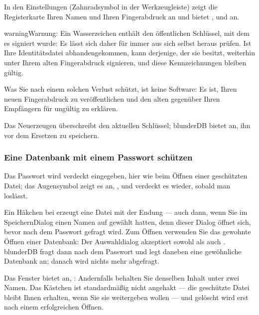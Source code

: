 \documentclass[letterpaper,10pt,german]{sphinxmanual}
\begin{document}
\sphinxAtStartPar
In den Einstellungen (Zahnradsymbol in der Werkzeugleiste) zeigt die Registerkarte  Ihren Namen und Ihren Fingerabdruck an und bietet ,  und  an.

\begin{sphinxadmonition}{warning}{Warnung:}
\sphinxAtStartPar
{} Ein Wasserzeichen enthält den öffentlichen Schlüssel, mit dem es signiert wurde: Es lässt sich daher für immer aus sich selbst heraus prüfen. Ist Ihre Identitätsdatei abhandengekommen, kann derjenige, der sie besitzt, weiterhin unter Ihrem alten Fingerabdruck signieren, und diese Kennzeichnungen bleiben gültig.

\sphinxAtStartPar
Was Sie nach einem solchen Verlust schützt, ist keine Software: Es ist, Ihren neuen Fingerabdruck zu veröffentlichen und den alten gegenüber Ihren Empfängern für ungültig zu erklären.

\sphinxAtStartPar
Das Neuerzeugen überschreibt den aktuellen Schlüssel; blunderDB bietet an, ihn vor dem Ersetzen zu speichern.
\end{sphinxadmonition}


\subsubsection{Eine Datenbank mit einem Passwort schützen}
\label{\detokenize{manuel:proteger-une-base-par-un-mot-de-passe}}
\sphinxAtStartPar
Das Passwort wird verdeckt eingegeben, hier wie beim Öffnen einer geschützten Datei; das Augensymbol zeigt es an, , und verdeckt es wieder, sobald man loslässt.

\sphinxAtStartPar
Ein Häkchen bei  erzeugt eine Datei mit der Endung  — auch dann, wenn Sie im Speichern\sphinxhyphen{}Dialog einen Namen auf  gewählt hatten, denn dieser Dialog öffnet sich, bevor nach dem Passwort gefragt wird. Zum Öffnen verwenden Sie das gewohnte Öffnen einer Datenbank: Der Auswahldialog akzeptiert sowohl  als auch . blunderDB fragt dann nach dem Passwort und legt daneben eine gewöhnliche Datenbank an; danach wird nichts mehr abgefragt.

\sphinxAtStartPar
Das Fenster bietet an, : Andernfalls behalten Sie denselben Inhalt unter zwei Namen. Das Kästchen ist standardmäßig nicht angehakt — die geschützte Datei bleibt Ihnen erhalten, wenn Sie sie weitergeben wollen — und gelöscht wird erst nach einem erfolgreichen Öffnen.
\end{document}
